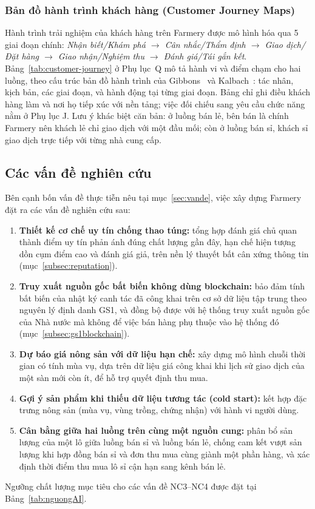 \subsubsection{Bản đồ hành trình khách hàng (Customer Journey Maps)}
\label{subsec:customer-journey}

Hành trình trải nghiệm của khách hàng trên Farmery được mô hình hóa qua 5 giai đoạn chính: \textit{Nhận biết/Khám phá $\rightarrow$ Cân nhắc/Thẩm định $\rightarrow$ Giao dịch/Đặt hàng $\rightarrow$ Giao nhận/Nghiệm thu $\rightarrow$ Đánh giá/Tái gắn kết}. Bảng~\ref{tab:customer-journey} ở Phụ lục~Q mô tả hành vi và điểm chạm cho hai luồng, theo cấu trúc bản đồ hành trình của Gibbons~\cite{gibbons2018journey} và Kalbach~\cite{kalbach2020mapping}: tác nhân, kịch bản, các giai đoạn, và hành động tại từng giai đoạn. Bảng chỉ ghi điều khách hàng làm và nơi họ tiếp xúc với nền tảng; việc đối chiếu sang yêu cầu chức năng nằm ở Phụ lục J. Lưu ý khác biệt căn bản: ở luồng bán lẻ, bên bán là chính Farmery nên khách lẻ chỉ giao dịch với một đầu mối; còn ở luồng bán sỉ, khách sỉ giao dịch trực tiếp với từng nhà cung cấp.


\subsection{Các vấn đề nghiên cứu}
\label{subsec:vandenghiencuu}

Bên cạnh bốn vấn đề thực tiễn nêu tại mục~\ref{sec:vande}, việc xây dựng Farmery đặt ra các vấn đề nghiên cứu sau:
\begin{enumerate}
    \item[\textbf{NC1.}] \textbf{Thiết kế cơ chế uy tín chống thao túng:} tổng hợp đánh giá chủ quan thành điểm uy tín phản ánh đúng chất lượng gần đây, hạn chế hiện tượng dồn cụm điểm cao và đánh giá giả, trên nền lý thuyết bất cân xứng thông tin (mục~\ref{subsec:reputation}).
    \item[\textbf{NC2.}] \textbf{Truy xuất nguồn gốc bất biến không dùng blockchain:} bảo đảm tính bất biến của nhật ký canh tác đã công khai trên cơ sở dữ liệu tập trung theo nguyên lý định danh GS1, và đồng bộ được với hệ thống truy xuất nguồn gốc của Nhà nước mà không để việc bán hàng phụ thuộc vào hệ thống đó (mục~\ref{subsec:gs1blockchain}).
    \item[\textbf{NC3.}] \textbf{Dự báo giá nông sản với dữ liệu hạn chế:} xây dựng mô hình chuỗi thời gian có tính mùa vụ, dựa trên dữ liệu giá công khai khi lịch sử giao dịch của một sàn mới còn ít, để hỗ trợ quyết định thu mua.
    \item[\textbf{NC4.}] \textbf{Gợi ý sản phẩm khi thiếu dữ liệu tương tác (cold start):} kết hợp đặc trưng nông sản (mùa vụ, vùng trồng, chứng nhận) với hành vi người dùng.
    \item[\textbf{NC5.}] \textbf{Cân bằng giữa hai luồng trên cùng một nguồn cung:} phân bổ sản lượng của một lô giữa luồng bán sỉ và luồng bán lẻ, chống cam kết vượt sản lượng khi hợp đồng bán sỉ và đơn thu mua cùng giành một phần hàng, và xác định thời điểm thu mua lô sỉ cận hạn sang kênh bán lẻ.
\end{enumerate}
Ngưỡng chất lượng mục tiêu cho các vấn đề NC3--NC4 được đặt tại Bảng~\ref{tab:nguongAI}.

